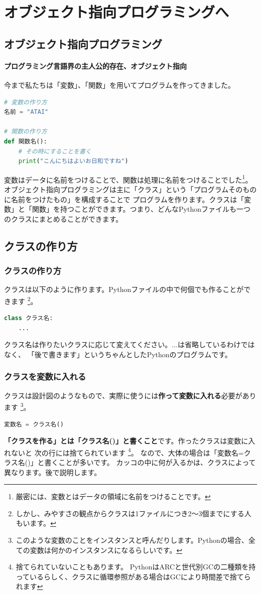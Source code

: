 \documentclass[12pt, a4paper, dvipdfmx]{book}
\begin{document}
\chapter{オブジェクト指向プログラミングへ}\label{ch:3}
\section{オブジェクト指向プログラミング}
\subsubsection{プログラミング言語界の主人公的存在、オブジェクト指向}
今まで私たちは「変数」、「関数」を用いてプログラムを作ってきました。
\begin{lstlisting}[caption=復習,label=sample, language=Python]
# 変数の作り方
名前 = "ATAI"

# 関数の作り方
def 関数名():
    # その時にすることを書く
    print("こんにちはよいお日和ですね")
\end{lstlisting}
変数はデータに名前をつけることで、関数は処理に名前をつけることでした\footnote{厳密には、変数とはデータの領域に名前をつけることです。}。
オブジェクト指向プログラミングは主に「クラス」という「プログラムそのものに名前をつけたもの」を構成することで
プログラムを作ります。クラスは「変数」と「関数」を持つことができます。つまり、どんなPythonファイルも一つのクラスにまとめることができます。
\section{クラスの作り方}
\subsection{クラスの作り方}
クラスは以下のように作ります。Pythonファイルの中で何個でも作ることができます
\footnote{しかし、みやすさの観点からクラスは1ファイルにつき2〜3個までにする人もいます。}。
\newpage
\begin{lstlisting}[caption=クラスの作り方,label=sample, language=Python]
class クラス名:
    ...
\end{lstlisting}
クラス名は作りたいクラスに応じて変えてください。...は省略しているわけではなく、
「後で書きます」というちゃんとしたPythonのプログラムです。

\subsection{クラスを変数に入れる}
クラスは設計図のようなもので、実際に使うには\textbf{作って変数に入れる}必要があります
\footnote{このような変数のことをインスタンスと呼んだりします。Pythonの場合、全ての変数は何かのインスタンスになるらしいです。}。
\begin{lstlisting}[caption=クラスを変数に入れる,label=sample, language=Python]
変数名 = クラス名()
\end{lstlisting}
\textbf{「クラスを作る」とは「クラス名()」と書くこと}です。作ったクラスは変数に入れないと
次の行には捨てられています
\footnote{捨てられていないこともあります。
  PythonはARCと世代別GCの二種類を持っているらしく、クラスに循環参照がある場合はGCにより時間差で捨てられます}。
なので、大体の場合は「変数名=クラス名()」と書くことが多いです。
カッコの中に何が入るかは、クラスによって異なります。後で説明します。
\end{document}
